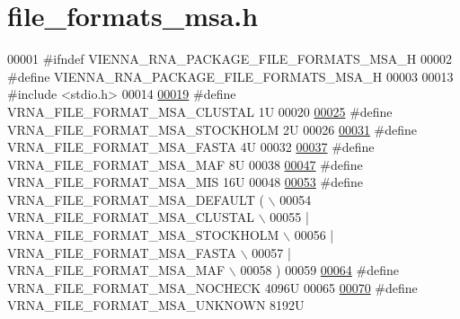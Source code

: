 \hypertarget{file__formats__msa_8h_source}{}\section{file\+\_\+formats\+\_\+msa.\+h}
\label{file__formats__msa_8h_source}

\begin{DoxyCode}
00001 \textcolor{preprocessor}{#ifndef VIENNA\_RNA\_PACKAGE\_FILE\_FORMATS\_MSA\_H}
00002 \textcolor{preprocessor}{#define VIENNA\_RNA\_PACKAGE\_FILE\_FORMATS\_MSA\_H}
00003 
00013 \textcolor{preprocessor}{#include <stdio.h>}
00014 
\mbox{\hyperlink{group__file__utils_ga79a23de2c7249f2cccd762e475c81859}{00019}} \textcolor{preprocessor}{#define VRNA\_FILE\_FORMAT\_MSA\_CLUSTAL      1U}
00020 
\mbox{\hyperlink{group__file__utils_ga62be992445cd8ab2ad7a8fded944338b}{00025}} \textcolor{preprocessor}{#define VRNA\_FILE\_FORMAT\_MSA\_STOCKHOLM    2U}
00026 
\mbox{\hyperlink{group__file__utils_gacf6274a2c825f34e4131404665b00604}{00031}} \textcolor{preprocessor}{#define VRNA\_FILE\_FORMAT\_MSA\_FASTA        4U}
00032 
\mbox{\hyperlink{group__file__utils_gab3186d774c01570d2a47d0308eec4927}{00037}} \textcolor{preprocessor}{#define VRNA\_FILE\_FORMAT\_MSA\_MAF          8U}
00038 
\mbox{\hyperlink{group__file__utils_ga494488a771aa0c602fb4cf445be34d47}{00047}} \textcolor{preprocessor}{#define VRNA\_FILE\_FORMAT\_MSA\_MIS          16U}
00048 
\mbox{\hyperlink{group__file__utils_ga4acc255373831856a8417b68de8a94c0}{00053}} \textcolor{preprocessor}{#define VRNA\_FILE\_FORMAT\_MSA\_DEFAULT      ( \(\backslash\)}
00054 \textcolor{preprocessor}{    VRNA\_FILE\_FORMAT\_MSA\_CLUSTAL \(\backslash\)}
00055 \textcolor{preprocessor}{    | VRNA\_FILE\_FORMAT\_MSA\_STOCKHOLM \(\backslash\)}
00056 \textcolor{preprocessor}{    | VRNA\_FILE\_FORMAT\_MSA\_FASTA \(\backslash\)}
00057 \textcolor{preprocessor}{    | VRNA\_FILE\_FORMAT\_MSA\_MAF \(\backslash\)}
00058 \textcolor{preprocessor}{    )}
00059 
\mbox{\hyperlink{group__file__utils_ga229fb3778ecabea4782902b69fa48fd1}{00064}} \textcolor{preprocessor}{#define VRNA\_FILE\_FORMAT\_MSA\_NOCHECK      4096U}
00065 
\mbox{\hyperlink{group__file__utils_gabdc948f547e550125de3e7c65878400c}{00070}} \textcolor{preprocessor}{#define VRNA\_FILE\_FORMAT\_MSA\_UNKNOWN      8192U}

\end{DoxyCode}
